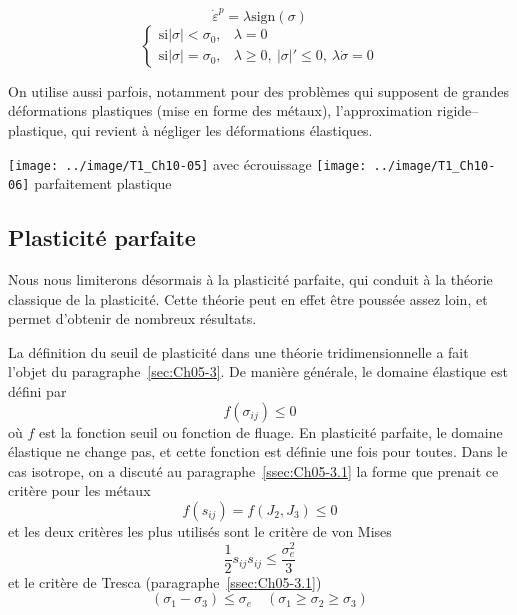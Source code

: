 \begin{equation}
    \dot{\varepsilon}^p = \lambda \text{sign} (\sigma)
    \label{eq:Ch10-007}
\end{equation}
\begin{equation}
    \left\{
    \begin{aligned}
        \text{si} |\sigma| < \sigma_0, & \lambda = 0 \\
        \text{si} |\sigma| = \sigma_0, & \lambda \geq 0, \ |\sigma|' \leq 0, \ \lambda \dot{\sigma} = 0
    \end{aligned}
    \right.
    \label{eq:Ch10-008}
\end{equation}

On utilise aussi parfois, notamment pour des problèmes qui supposent de grandes déformations plastiques (mise en forme des métaux), l'approximation rigide--plastique, qui revient à négliger les déformations élastiques. 
\begin{multicols}{2}
    \centering
    \texttt{[image: ../image/T1\_Ch10-05]}
    avec écrouissage
    \columnbreak
    \texttt{[image: ../image/T1\_Ch10-06]}
    parfaitement plastique
\end{multicols}

\subsection{Plasticité parfaite}
Nous nous limiterons désormais à la plasticité parfaite, qui conduit à la théorie classique de la plasticité.
Cette théorie peut en effet être poussée assez loin, et permet d'obtenir de nombreux résultats. 

La définition du seuil de plasticité dans une théorie tridimensionnelle a fait l'objet du paragraphe~\ref{sec:Ch05-3}.
De manière générale, le domaine élastique est défini par 
\begin{equation}
    f\left( \sigma_{ij} \right) \leq 0
    \label{eq:Ch10-009}
\end{equation}
où $f$ est la fonction seuil ou fonction de fluage.
En plasticité parfaite, le domaine élastique ne change pas, et cette fonction est définie une fois pour toutes.
Dans le cas isotrope, on a discuté au paragraphe~\ref{ssec:Ch05-3.1} la forme que prenait ce critère pour les métaux 
\begin{equation}
    f\left( s_{ij} \right) = f\left( J_2,J_3 \right) \leq 0
    \label{eq:Ch10-010}
\end{equation}
et les deux critères les plus utilisés sont le critère de von Mises 
\begin{equation}
    \frac{1}{2} s_{ij} s_{ij} \leq \frac{\sigma_e^2}{3}
    \label{eq:Ch10-011}
\end{equation}
et le critère de Tresca (paragraphe~\ref{ssec:Ch05-3.1}) 
\begin{equation}
    \left( \sigma_1 - \sigma_3 \right) \leq \sigma_e \quad \left( \sigma_1 \geq \sigma_2 \geq \sigma_3 \right)
    \label{eq:Ch10-012}
\end{equation}

